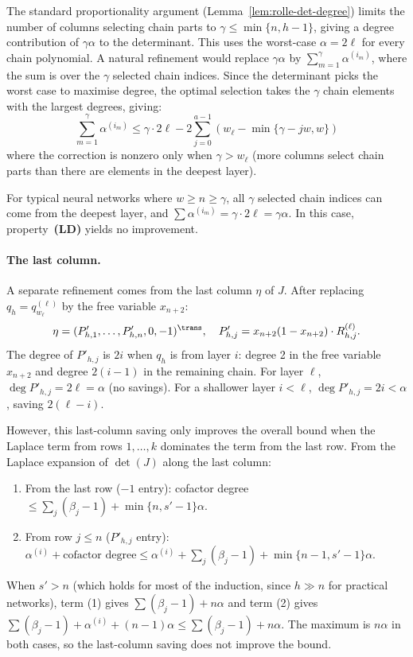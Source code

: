 The standard proportionality argument (Lemma~\ref{lem:rolle-det-degree}) limits the number of columns selecting chain parts to $\gamma \leq \min\{n, h-1\}$, giving a degree contribution of $\gamma \alpha$ to the determinant. This uses the worst-case $\alpha = 2\ell$ for every chain polynomial. A natural refinement would replace $\gamma \alpha$ by $\sum_{m=1}^\gamma \alpha^{(i_m)}$, where the sum is over the $\gamma$ selected chain indices. Since the determinant picks the worst case to maximise degree, the optimal selection takes the $\gamma$ chain elements with the largest degrees, giving:
\begin{equation}\label{eq:optimal-selection}
  \sum_{m=1}^{\gamma}\alpha^{(i_m)} \leq \gamma \cdot 2\ell - 2\sum_{j=0}^{a-1}(w_\ell - \min\{\gamma - jw, w\})
\end{equation}
where the correction is nonzero only when $\gamma > w_\ell$ (more columns select chain parts than there are elements in the deepest layer).

For typical neural networks where $w \geq n \geq \gamma$, all $\gamma$ selected chain indices can come from the deepest layer, and $\sum \alpha^{(i_m)} = \gamma \cdot 2\ell = \gamma\alpha$. In this case, property~\textbf{(LD)} yields no improvement.

\paragraph{The last column.}
A separate refinement comes from the last column $\eta$ of $J$. After replacing $q_h = q_{w_\ell}^{(\ell)}$ by the free variable $x_{n+2}$:
\begin{equation*}
  \eta = (P'_{h,1}, \ldots, P'_{h,n}, 0, -1)^\trans, \quad P'_{h,j} = x_{n+2}(1-x_{n+2}) \cdot R_{h,j}^{(\ell)}.
\end{equation*}
The degree of $P'_{h,j}$ is $2i$ when $q_h$ is from layer $i$: degree 2 in the free variable $x_{n+2}$ and degree $2(i-1)$ in the remaining chain. For layer $\ell$, $\deg P'_{h,j} = 2\ell = \alpha$ (no savings). For a shallower layer $i < \ell$, $\deg P'_{h,j} = 2i < \alpha$, saving $2(\ell - i)$.

However, this last-column saving only improves the overall bound when the Laplace term from rows $1, \ldots, k$ dominates the term from the last row. From the Laplace expansion of $\det(J)$ along the last column:
\begin{enumerate}
  \item From the last row ($-1$ entry): cofactor degree $\leq \sum_{j}(\beta_j - 1) + \min\{n, s'-1\}\alpha$.
  \item From row $j \leq n$ ($P'_{h,j}$ entry): $\alpha^{(i)} + \text{cofactor degree} \leq \alpha^{(i)} + \sum_j(\beta_j - 1) + \min\{n-1, s'-1\}\alpha$.
\end{enumerate}
When $s' > n$ (which holds for most of the induction, since $h \gg n$ for practical networks), term (1) gives $\sum(\beta_j - 1) + n\alpha$ and term (2) gives $\sum(\beta_j - 1) + \alpha^{(i)} + (n-1)\alpha \leq \sum(\beta_j - 1) + n\alpha$. The maximum is $n\alpha$ in both cases, so the last-column saving does not improve the bound.

